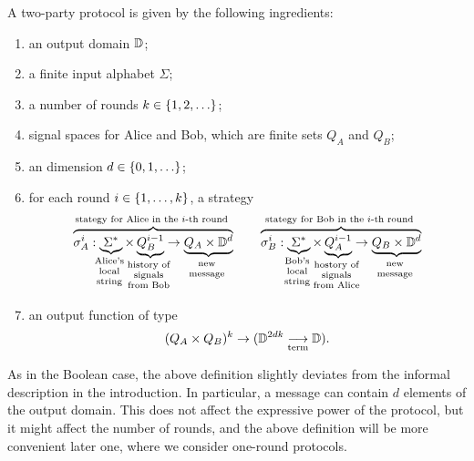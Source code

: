 \begin{definition}\label{def:two-party-protocol-general} A two-party protocol   
   is given by the following ingredients: 
  \begin{enumerate}
    \item an output domain $\mathbb D$;
    \item a finite input alphabet $\Sigma$;
    \item a number of rounds $k \in \{1,2,\ldots\}$;
    \item signal spaces for Alice and Bob, which are finite sets $Q_A$ and $Q_B$;
    \item an  dimension $d \in \{0,1,\ldots\}$;
    \item for each round $i \in \{1,\ldots,k\}$, a strategy
    \begin{align*}
    \myoverbrace{\sigma_A^i : \myunderbrace{\Sigma^*}{Alice's \\ local\\ string} \times \myunderbrace{Q_B^{i-1}}{history of \\ signals \\ from Bob}  \to \myunderbrace{Q_A \times \domain^d}{new\\ message}}{stategy for Alice in the $i$-th round}
    \qquad 
        \myoverbrace{\sigma_B^i : \myunderbrace{\Sigma^*}{Bob's \\ local\\ string} \times \myunderbrace{Q_A^{i-1}}{hostory of \\ signals \\ from Alice}  \to \myunderbrace{Q_B \times \domain^d}{new\\ message}}{stategy for Bob in the $i$-th round}
    \end{align*}
    \item an output function of type \begin{align*}
    (Q_A \times Q_B)^{k} \to (\mathbb D^{2dk} \underset{\text{term}}{\longrightarrow} \mathbb D).
    \end{align*}
  \end{enumerate}
\end{definition}

As in the Boolean case, the above definition slightly deviates from the informal description in the introduction. In particular, a message can contain $d$ elements of the output domain. This does not affect the expressive power of the protocol, but it might affect the number of rounds, and the above definition will be more convenient later one, where we consider one-round protocols.


